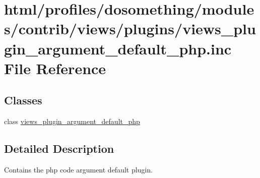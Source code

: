 \hypertarget{views__plugin__argument__default__php_8inc}{
\section{html/profiles/dosomething/modules/contrib/views/plugins/views\_\-plugin\_\-argument\_\-default\_\-php.inc File Reference}
\label{views__plugin__argument__default__php_8inc}
}
\subsection*{Classes}
\begin{DoxyCompactItemize}
\item 
class \hyperlink{classviews__plugin__argument__default__php}{views\_\-plugin\_\-argument\_\-default\_\-php}
\end{DoxyCompactItemize}


\subsection{Detailed Description}
Contains the php code argument default plugin. 